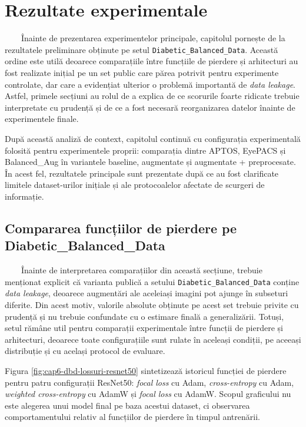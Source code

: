 \documentclass[12pt, a4paper, twoside, romanian]{teza-upb}
\begin{document}
\chapter{Rezultate experimentale}

\ \ \ \ Înainte de prezentarea experimentelor principale, capitolul pornește de la rezultatele preliminare
obținute pe setul \texttt{Diabetic\_Balanced\_Data}. Această ordine este utilă deoarece comparațiile
între funcțiile de pierdere și arhitecturi au fost realizate inițial pe un set public care părea potrivit
pentru experimente controlate, dar care a evidențiat ulterior o problemă importantă de \textit{data
leakage}. Astfel, primele secțiuni au rolul de a explica de ce scorurile foarte ridicate trebuie
interpretate cu prudență și de ce a fost necesară reorganizarea datelor înainte de experimentele finale.
\bigskip

După această analiză de context, capitolul continuă cu configurația experimentală folosită pentru
experimentele proprii: comparația dintre APTOS, EyePACS și Balanced\_Aug în variantele baseline,
augmentate și augmentate + preprocesate. În acest fel, rezultatele principale sunt prezentate după ce
au fost clarificate limitele dataset-urilor inițiale și ale protocoalelor afectate de scurgeri de
informație.
\bigskip

\section{Compararea funcțiilor de pierdere pe Diabetic\_Balanced\_Data}

\ \ \ \ Înainte de interpretarea comparațiilor din această secțiune, trebuie menționat explicit că
varianta publică a setului \texttt{Diabetic\_Balanced\_Data} conține \textit{data leakage}, deoarece
augmentări ale aceleiași imagini pot ajunge în subseturi diferite. Din acest motiv, valorile absolute
obținute pe acest set trebuie privite cu prudență și nu trebuie confundate cu o estimare finală a
generalizării. Totuși, setul rămâne util pentru comparații experimentale între funcții de pierdere și
arhitecturi, deoarece toate configurațiile sunt rulate în aceleași condiții, pe aceeași distribuție și
cu același protocol de evaluare.
\bigskip

Figura \ref{fig:cap6-dbd-lossuri-resnet50} sintetizează istoricul funcției de pierdere pentru patru
configurații ResNet50: \textit{focal loss} cu Adam, \textit{cross-entropy} cu Adam,
\textit{weighted cross-entropy} cu AdamW și \textit{focal loss} cu AdamW. Scopul graficului nu este
alegerea unui model final pe baza acestui dataset, ci observarea comportamentului relativ al
funcțiilor de pierdere în timpul antrenării.
\bigskip
\end{document}
